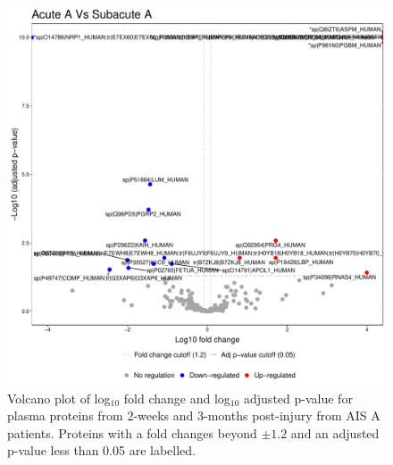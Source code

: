 \documentclass[9pt,lineno]{elife}
\begin{document}
\begin{landscape}
\begin{landscape}
\begin{landscape}
\begin{landscape}
\begin{figure}
\includegraphics[width=1\linewidth]{figures/openms_protein_quantification/label_free/volcano_plots/openms_volcano_plot_2021-08-10_0004} \caption{Volcano plot of log\(_10\) fold change and log\(_10\) adjusted p-value for plasma proteins from 2-weeks and 3-months post-injury from AIS A patients. Proteins with a fold changes beyond \(\pm 1.2\) and an adjusted p-value less than 0.05 are labelled.}\label{fig:volc-plot-acute-a-vs-subacute-a}
\end{figure}




\end{landscape}
\end{landscape}
\end{landscape}
\end{landscape}
\end{document}
